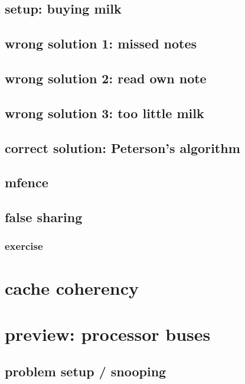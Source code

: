 \subsection{setup: buying milk}


\subsection{wrong solution 1: missed notes}


\subsection{wrong solution 2: read own note}


\subsection{wrong solution 3: too little milk}


\subsection{correct solution: Peterson's algorithm}


\subsection{mfence}


\subsection{false sharing}

\subsubsection{exercise}


\section{cache coherency}
\section{preview: processor buses}


\subsection{problem setup / snooping}

